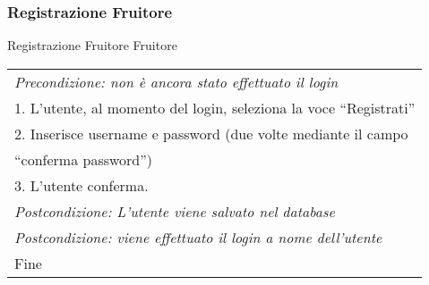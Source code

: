 \begin{minipage}{\textwidth}
    \subsubsection{Registrazione Fruitore}
    \usecase
        {Registrazione Fruitore}
        {
            Fruitore %
        }
        {
            \begin{tabular}{l}
                \textit{Precondizione: non è ancora stato effettuato il login}\\
                1. L'utente, al momento del login, seleziona la voce ``Registrati''\\
                2. Inserisce username e password (due volte mediante il campo \\ ``conferma password'')\\
                3. L'utente conferma.\\
                \textit{Postcondizione: L'utente viene salvato nel database}\\
                \textit{Postcondizione: viene effettuato il login a nome dell'utente}\\
                Fine
            \end{tabular} \\

            \\

            \\

}
\end{minipage}
